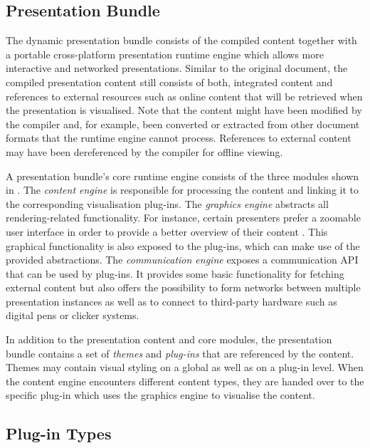    \subsection{\mxp Presentation Bundle}

    The dynamic \mxp presentation bundle consists of the compiled content
    together with a portable cross-platform presentation runtime engine which
    allows more interactive and networked presentations. Similar to the
    original document, the compiled presentation content still consists of
    both, integrated content and references to external resources such as
    online content that will be retrieved when the presentation is visualised.
    Note that the content might have been modified by the compiler and, for
    example, been converted or extracted from other document formats that the
    runtime engine cannot process.  References to external content may have
    been dereferenced by the compiler for offline viewing.

    A presentation bundle's core runtime engine consists of the three modules
    shown in . The \emph{content engine} is responsible
    for processing the content and linking it to the corresponding
    visualisation plug-ins. The \emph{graphics engine} abstracts all
    rendering-related functionality. For instance, certain presenters prefer a
    zoomable user interface in order to provide a better overview of their
    content \citep{reuss-1}. This graphical functionality is also exposed to
    the plug-ins, which can make use of the provided abstractions. The
    \emph{communication engine} exposes a communication API that can be used by
    plug-ins. It provides some basic functionality for fetching external
    content but also offers the possibility to form networks between multiple
    \mxp presentation instances as well as to connect to third-party hardware
    such as digital pens or clicker systems.

    In addition to the presentation content and core modules, the presentation
    bundle contains a set of \emph{themes} and \emph{plug-ins} that are
    referenced by the content. Themes may contain visual styling on a global as
    well as on a plug-in level. When the content engine encounters different
    content types, they are handed over to the specific plug-in which uses the
    graphics engine to visualise the content.

   \subsection{Plug-in Types}

